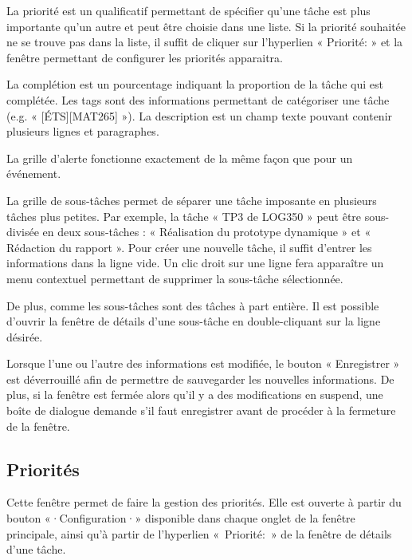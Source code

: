 \documentclass[letterpaper, oneside, 12pt, these, creativecommons]{thETS}
\begin{document}
La priorité est un qualificatif permettant de spécifier qu'une tâche est plus importante qu'un autre et peut être choisie dans une liste. Si la priorité souhaitée ne se trouve pas dans la liste, il suffit de cliquer sur l'hyperlien « Priorité: » et la fenêtre permettant de configurer les priorités apparaitra.

La complétion est un pourcentage indiquant la proportion de la tâche qui est complétée. Les tags sont des informations permettant de catégoriser une tâche (e.g. « [ÉTS][MAT265] »). La description est un champ texte pouvant contenir plusieurs lignes et paragraphes.

La grille d'alerte fonctionne exactement de la même façon que pour un événement.

La grille de sous-tâches permet de séparer une tâche imposante en plusieurs tâches plus petites. Par exemple, la tâche « TP3 de LOG350 » peut être sous-divisée en deux sous-tâches : « Réalisation du prototype dynamique » et « Rédaction du rapport ». Pour créer une nouvelle tâche, il suffit d'entrer les informations dans la ligne vide. Un clic droit sur une ligne fera apparaître un menu contextuel permettant de supprimer la sous-tâche sélectionnée.

De plus, comme les sous-tâches sont des tâches à part entière. Il est possible d'ouvrir la fenêtre de détails d'une sous-tâche en double-cliquant sur la ligne désirée.

Lorsque l'une ou l'autre des informations est modifiée, le bouton « Enregistrer » est déverrouillé afin de permettre de sauvegarder les nouvelles informations. De plus, si la fenêtre est fermée alors qu'il y a des modifications en suspend, une boîte de dialogue demande s'il faut enregistrer avant de procéder à la fermeture de la fenêtre.

\subsection{Priorités}

Cette fenêtre permet de faire la gestion des priorités. Elle est ouverte à partir du bouton «·Configuration·» disponible dans chaque onglet de la fenêtre principale, ainsi qu'à partir de l'hyperlien « Priorité: » de la fenêtre de détails d'une tâche.
\end{document}
